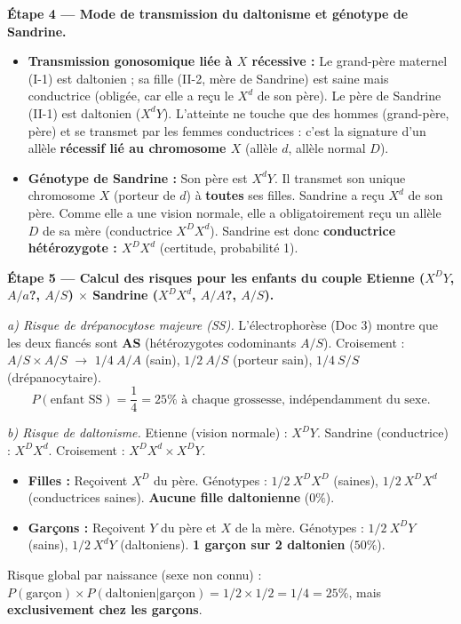 \documentclass[11pt]{article}
\begin{document}
\begin{exoresolu}
\textbf{Étape 4 — Mode de transmission du daltonisme et génotype de Sandrine.}
\begin{itemize}
\item \textbf{Transmission gonosomique liée à $X$ récessive :} Le grand-père maternel (I-1) est daltonien ; sa fille (II-2, mère de Sandrine) est saine mais conductrice (obligée, car elle a reçu le $X^d$ de son père). Le père de Sandrine (II-1) est daltonien ($X^d Y$). L'atteinte ne touche que des hommes (grand-père, père) et se transmet par les femmes conductrices : c'est la signature d'un allèle \textbf{récessif lié au chromosome $X$} (allèle $d$, allèle normal $D$).
\item \textbf{Génotype de Sandrine :} Son père est $X^d Y$. Il transmet son unique chromosome $X$ (porteur de $d$) à \textbf{toutes} ses filles. Sandrine a reçu $X^d$ de son père. Comme elle a une vision normale, elle a obligatoirement reçu un allèle $D$ de sa mère (conductrice $X^D X^d$). Sandrine est donc \textbf{conductrice hétérozygote : $X^D X^d$} (certitude, probabilité 1).
\end{itemize}

\textbf{Étape 5 — Calcul des risques pour les enfants du couple Etienne ($X^D Y$, $A/a$?, $A/S$) $\times$ Sandrine ($X^D X^d$, $A/A$?, $A/S$).}

\emph{a) Risque de drépanocytose majeure (SS).}
L'électrophorèse (Doc 3) montre que les deux fiancés sont \textbf{AS} (hétérozygotes codominants $A/S$).
Croisement : $A/S \times A/S$ $\rightarrow$ $1/4\ A/A$ (sain), $1/2\ A/S$ (porteur sain), $1/4\ S/S$ (drépanocytaire).
\[
\boxed{P(\text{enfant SS}) = \dfrac{1}{4} = 25\% \text{ à chaque grossesse, indépendamment du sexe.}}
\]

\emph{b) Risque de daltonisme.}
Etienne (vision normale) : $X^D Y$. Sandrine (conductrice) : $X^D X^d$.
Croisement : $X^D X^d \times X^D Y$.
\begin{itemize}
\item \textbf{Filles :} Reçoivent $X^D$ du père. Génotypes : $1/2\ X^D X^D$ (saines), $1/2\ X^D X^d$ (conductrices saines). \textbf{Aucune fille daltonienne} ($0\%$).
\item \textbf{Garçons :} Reçoivent $Y$ du père et $X$ de la mère. Génotypes : $1/2\ X^D Y$ (sains), $1/2\ X^d Y$ (daltoniens). \textbf{1 garçon sur 2 daltonien} ($50\%$).
\end{itemize}
Risque global par naissance (sexe non connu) : $P(\text{garçon}) \times P(\text{daltonien}| \text{garçon}) = 1/2 \times 1/2 = 1/4 = 25\%$, mais \textbf{exclusivement chez les garçons}.


\end{exoresolu}
\end{document}
